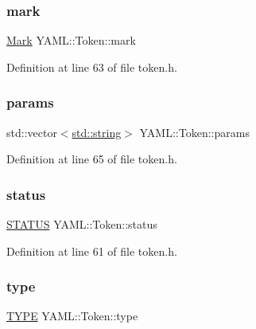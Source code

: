 \subsubsection{\texorpdfstring{mark}{mark}}
{\footnotesize\ttfamily \mbox{\hyperlink{struct_y_a_m_l_1_1_mark}{Mark}} Y\+A\+M\+L\+::\+Token\+::mark}



Definition at line 63 of file token.\+h.

\mbox{\label{struct_y_a_m_l_1_1_token_a15b0ad4a1c7f27f5284a48216f7c3464}} 
\subsubsection{\texorpdfstring{params}{params}}
{\footnotesize\ttfamily std\+::vector$<$\mbox{\hyperlink{glad_8h_ac83513893df92266f79a515488701770}{std\+::string}}$>$ Y\+A\+M\+L\+::\+Token\+::params}



Definition at line 65 of file token.\+h.

\mbox{\label{struct_y_a_m_l_1_1_token_a32ffa6eef8b549f2cd2b566dc399d219}} 
\subsubsection{\texorpdfstring{status}{status}}
{\footnotesize\ttfamily \mbox{\hyperlink{struct_y_a_m_l_1_1_token_af37af1a3129a5f1c36f08d41f668f7e5}{S\+T\+A\+T\+US}} Y\+A\+M\+L\+::\+Token\+::status}



Definition at line 61 of file token.\+h.

\mbox{\label{struct_y_a_m_l_1_1_token_a0c2fb43511afadcfcd0169bfc4838cf6}} 
\subsubsection{\texorpdfstring{type}{type}}
{\footnotesize\ttfamily \mbox{\hyperlink{struct_y_a_m_l_1_1_token_a60bcc6615b60f00ae9bce3aaeebf6d14}{T\+Y\+PE}} Y\+A\+M\+L\+::\+Token\+::type}




